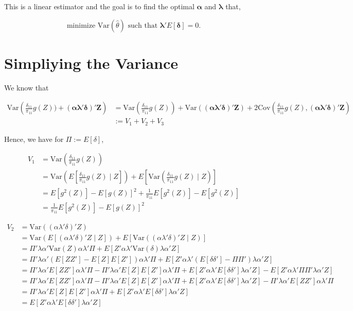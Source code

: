 \documentclass[
  letterpaper,
  DIV=11,
  numbers=noendperiod]{scrartcl}
\newcommand{\bf}{\mathbf}
\newcommand{\Var}{\text{Var}}
\newcommand{\Cov}{\text{Cov}}
\begin{document}
This is a linear estimator and the goal is to find the optimal
\(\pmb{\alpha}\) and \(\pmb{\lambda}\) that,

\[ \text{minimize } \Var(\hat \theta) \text{ such that } 
\pmb{\lambda}' E[\pmb{\delta}] = 0.\]

\hypertarget{simpliying-the-variance}{%
\section{Simpliying the Variance}\label{simpliying-the-variance}}

We know that

\begin{align*}
\Var\left(\frac{\delta_{11}}{\pi_{11}}g(Z)) + 
  (\pmb \alpha \pmb \lambda' \pmb \delta)' \bf Z\right) 
&= \Var\left(\frac{\delta_{11}}{\pi_{11}}g(Z)\right) +
  \Var((\pmb \alpha \pmb \lambda' \pmb \delta)'\bf Z) +
  2 \Cov\left(\frac{\delta_{11}}{\pi_{11}}g(Z), 
  (\pmb \alpha \pmb \lambda' \pmb \delta)' \bf Z\right)\\
&:= V_1 + V_2 + V_3
\end{align*}

Hence, we have for \(\Pi := E[\delta]\),

\begin{align*}
V_1 &= \Var\left(\frac{\delta_{11}}{\pi_{11}}g(Z)\right) \\ 
&= \Var\left(E\left[\frac{\delta_{11}}{\pi_{11}}g(Z) \mid Z\right]\right)
+ E\left[\Var\left(\frac{\delta_{11}}{\pi_{11}}g(Z) \mid Z\right)\right]\\
  &= E[g^2(Z)] - E[g(Z)]^2 + \frac{1}{\pi_{11}}E[g^2(Z)] - E[g^2(Z)] \\ 
  &= \frac{1}{\pi_{11}} E[g^2(Z)] - E[g(Z)]^2
\end{align*}

\begin{align*}
V_2 &= \Var((\alpha \lambda' \delta)'Z) \\ 
&= \Var(E[(\alpha \lambda' \delta)'Z \mid Z]) + 
E[\Var((\alpha \lambda' \delta)'Z \mid Z)] \\ 
&= \Pi' \lambda \alpha'  \Var(Z) \alpha \lambda' \Pi + 
E[Z'\alpha \lambda' \Var(\delta)\lambda \alpha' Z]\\
&= \Pi' \lambda \alpha'  (E[ZZ'] - E[Z]E[Z']) \alpha \lambda' \Pi + 
E[Z'\alpha \lambda' (E[\delta \delta'] - \Pi\Pi')\lambda \alpha' Z]\\
&= \Pi' \lambda \alpha'  E[ZZ'] \alpha \lambda' \Pi -
\Pi' \lambda \alpha' E[Z]E[Z'] \alpha \lambda' \Pi + 
E[Z'\alpha \lambda' E[\delta \delta']\lambda \alpha' Z] - 
E[Z'\alpha \lambda' \Pi\Pi'\lambda \alpha' Z]\\
&= \Pi' \lambda \alpha'  E[ZZ'] \alpha \lambda' \Pi -
\Pi' \lambda \alpha' E[Z]E[Z'] \alpha \lambda' \Pi + 
E[Z'\alpha \lambda' E[\delta \delta']\lambda \alpha' Z] - 
\Pi' \lambda \alpha' E[ZZ'] \alpha \lambda' \Pi \\
&= \Pi' \lambda \alpha' E[Z]E[Z'] \alpha \lambda' \Pi + 
E[Z'\alpha \lambda' E[\delta \delta']\lambda \alpha' Z] \\
&= E[Z'\alpha \lambda' E[\delta \delta']\lambda \alpha' Z] \\
\end{align*}
\end{document}
